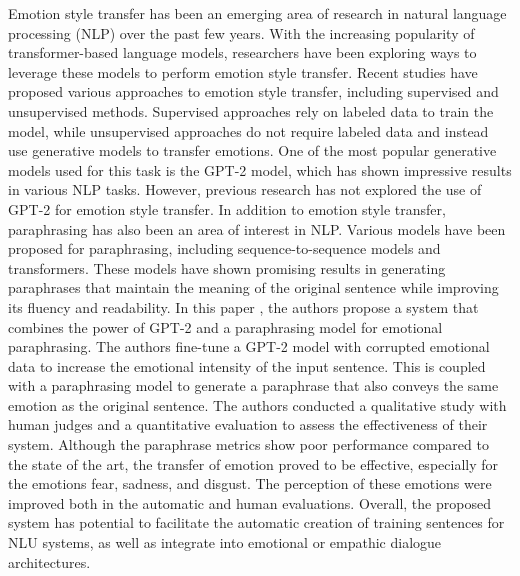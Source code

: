 \documentclass[12pt]{IEEEtran}
\begin{document}
Emotion style transfer has been an emerging area of research in natural language processing (NLP) over the past few years. With the increasing popularity of transformer-based language models, researchers have been exploring ways to leverage these models to perform emotion style transfer. Recent studies have proposed various approaches to emotion style transfer, including supervised and unsupervised methods. Supervised approaches rely on labeled data to train the model, while unsupervised approaches do not require labeled data and instead use generative models to transfer emotions.  One of the most popular generative models used for this task is the GPT-2 model, which has shown impressive results in various NLP tasks. However, previous research has not explored the use of GPT-2 for emotion style transfer. In addition to emotion style transfer, paraphrasing has also been an area of interest in NLP. Various models have been proposed for paraphrasing, including sequence-to-sequence models and transformers. These models have shown promising results in generating paraphrases that maintain the meaning of the original sentence while improving its fluency and readability.  In this paper \cite{emotion}, the authors propose a system that combines the power of GPT-2 and a paraphrasing model for emotional paraphrasing. The authors fine-tune a GPT-2 model with corrupted emotional data to increase the emotional intensity of the input sentence. This is coupled with a paraphrasing model to generate a paraphrase that also conveys the same emotion as the original sentence.  The authors conducted a qualitative study with human judges and a quantitative evaluation to assess the effectiveness of their system. Although the paraphrase metrics show poor performance compared to the state of the art, the transfer of emotion proved to be effective, especially for the emotions fear, sadness, and disgust. The perception of these emotions were improved both in the automatic and human evaluations. Overall, the proposed system has potential to facilitate the automatic creation of training sentences for NLU systems, as well as integrate into emotional or empathic dialogue architectures.
\end{document}
